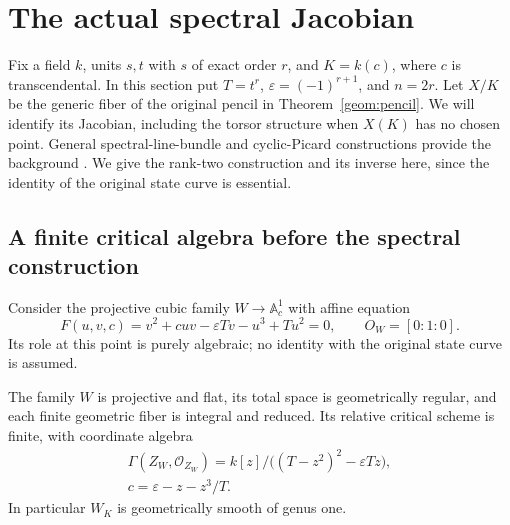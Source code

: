 \section{The actual spectral Jacobian}
\label{spec:section}

Fix a field $k$, units $s,t$ with $s$ of exact order $r$, and
$K=k(c)$, where $c$ is transcendental.  In this section put
$T=t^r$, $\varepsilon=(-1)^{r+1}$, and $n=2r$.
Let $X/K$ be the generic fiber of the original pencil in
Theorem~\ref{geom:pencil}.  We will identify its Jacobian, including
the torsor structure when $X(K)$ has no chosen point.  General
spectral-line-bundle and cyclic-Picard constructions provide the
background \cite{Beauville1990,InoueVanhaeckeYamazaki2015}.
We give the rank-two construction and its inverse here, since the
identity of the original state curve is essential.

\subsection{A finite critical algebra before the spectral construction}

Consider the projective cubic family $W\to\mathbb A^1_c$ with affine
equation
\begin{equation}
F(u,v,c)=v^2+cuv-\varepsilon Tv-u^3+Tu^2=0,
\qquad O_W=[0:1:0].
\label{spec:weierstrass}
\end{equation}
Its role at this point is purely algebraic; no identity with the
original state curve is assumed.

\begin{lemma}\label{spec:finite-critical}
The family $W$ is projective and flat, its total space is
geometrically regular, and each finite geometric fiber is integral
and reduced.  Its relative critical scheme is finite, with coordinate
algebra
\begin{equation}
\begin{gathered}
\Gamma(Z_W,\mathcal O_{Z_W})
 =k[z]/\bigl((T-z^2)^2-\varepsilon Tz\bigr),\\
c=\varepsilon-z-z^3/T.
\end{gathered}
\label{spec:critical-algebra}
\end{equation}
In particular $W_K$ is geometrically smooth of genus one.
\end{lemma}

